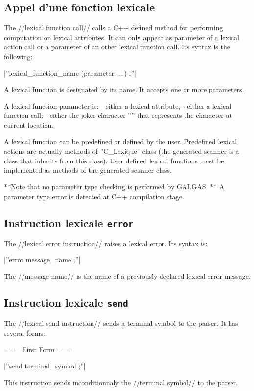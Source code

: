 {\subsection{Appel d'une fonction lexicale}

The //lexical function call// calls a C++ defined method for performing computation on lexical attributes. It can only appear as parameter of a lexical action call or a parameter of an other lexical function call. Its syntax is the following:

|''lexical\_function\_name (parameter, ...) ;''|

A lexical function is designated by its name. It accepts one or more parameters.

A lexical function parameter is:
  - either a lexical attribute,
  - either a lexical function call;
  - either the joker character ''\textquotesingle*\textquotesingle'' that represents the character at current location.

A lexical function can be predefined or defined by the user. Predefined lexical actions are actually methods of ''C\_Lexique'' class (the generated scanner is a class that inherits from this class). User defined lexical functions must be implemented as methods of the generated scanner class.

**Note that no parameter type checking is performed by GALGAS. ** A parameter type error is detected at C++ compilation stage.
 
\subsection{Instruction lexicale \texttt{error}}

The //lexical error instruction// raises a lexical error. Its syntax is:

|''error message\_name ;''|

The //message name// is the name of a previously declared lexical error message.

\subsection{Instruction lexicale \texttt{send}}

The //lexical send instruction// sends a terminal symbol to the parser. It has several forms:

=== First Form ===

|''send terminal\_symbol ;''|

This instruction sends inconditionnaly the //terminal symbol// to the parser.

}

